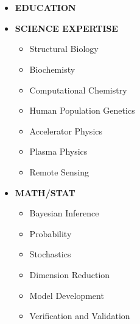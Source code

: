 \documentclass[a4paper,12pt]{memoir} %
\begin{document}
\framebreak %
~
\framebreak %

\makeuserinfo

\framebreak %
~
\framebreak %

\begin{itemize}[label={}, leftmargin=0pt]
  \item \large{\textbf{EDUCATION}}
    \vspace*{-0.25cm}
    \begin{itemize}[label={},leftmargin=0.5cm]
      \makeeducationitem

      \makeeducationitem

      \makeeducationitem
    \end{itemize}

  \MySep

  \item \large{\textbf{SCIENCE EXPERTISE}}
    \vspace*{-0.25cm}
    \normalsize{
      \begin{itemize}[label={}, leftmargin=0.5cm]
        \item Structural Biology
        \item Biochemisty
        \item Computational Chemistry
        \item Human Population Genetics
        \item Accelerator Physics
        \item Plasma Physics
        \item Remote Sensing
      \end{itemize}
  }

  \MySep

  \item \large{\textbf{MATH/STAT}}
    \vspace*{-0.25cm}
    \normalsize{
      \begin{itemize}[label={}, leftmargin=0.5cm]
        \item Bayesian Inference
        \item Probability
        \item Stochastics
        \item Dimension Reduction
        \item Model Development
        \item Verification and Validation
      \end{itemize}
    }


\end{itemize}
\end{document}
